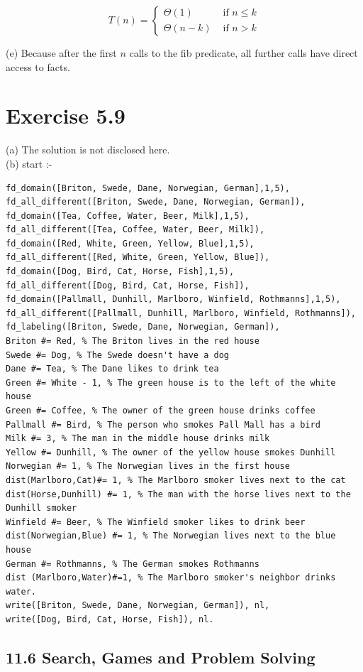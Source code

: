 \documentclass[10pt]{book}
\begin{document}
\begin{center}
\begin{enumerate}
\begin{center}
\begin{center}
\begin{center}
\begin{center}
\begin{center}
$$
T(n)= \begin{cases}\Theta(1) & \text { if } n \leq k \\ \Theta(n-k) & \text { if } n>k\end{cases}
$$

(e) Because after the first $n$ calls to the fib predicate, all further calls have direct access to facts.

\section*{Exercise 5.9}
(a) The solution is not disclosed here.\\
(b) start :-

\begin{verbatim}
fd_domain([Briton, Swede, Dane, Norwegian, German],1,5),
fd_all_different([Briton, Swede, Dane, Norwegian, German]),
fd_domain([Tea, Coffee, Water, Beer, Milk],1,5),
fd_all_different([Tea, Coffee, Water, Beer, Milk]),
fd_domain([Red, White, Green, Yellow, Blue],1,5),
fd_all_different([Red, White, Green, Yellow, Blue]),
fd_domain([Dog, Bird, Cat, Horse, Fish],1,5),
fd_all_different([Dog, Bird, Cat, Horse, Fish]),
fd_domain([Pallmall, Dunhill, Marlboro, Winfield, Rothmanns],1,5),
fd_all_different([Pallmall, Dunhill, Marlboro, Winfield, Rothmanns]),
fd_labeling([Briton, Swede, Dane, Norwegian, German]),
Briton #= Red, % The Briton lives in the red house
Swede #= Dog, % The Swede doesn't have a dog
Dane #= Tea, % The Dane likes to drink tea
Green #= White - 1, % The green house is to the left of the white house
Green #= Coffee, % The owner of the green house drinks coffee
Pallmall #= Bird, % The person who smokes Pall Mall has a bird
Milk #= 3, % The man in the middle house drinks milk
Yellow #= Dunhill, % The owner of the yellow house smokes Dunhill
Norwegian #= 1, % The Norwegian lives in the first house
dist(Marlboro,Cat)#= 1, % The Marlboro smoker lives next to the cat
dist(Horse,Dunhill) #= 1, % The man with the horse lives next to the Dunhill smoker
Winfield #= Beer, % The Winfield smoker likes to drink beer
dist(Norwegian,Blue) #= 1, % The Norwegian lives next to the blue house
German #= Rothmanns, % The German smokes Rothmanns
dist (Marlboro,Water)#=1, % The Marlboro smoker's neighbor drinks water.
write([Briton, Swede, Dane, Norwegian, German]), nl,
write([Dog, Bird, Cat, Horse, Fish]), nl.
\end{verbatim}

\subsection*{11.6 Search, Games and Problem Solving}

\end{center}
\end{center}
\end{center}
\end{center}
\end{center}
\end{enumerate}
\end{center}
\end{document}
